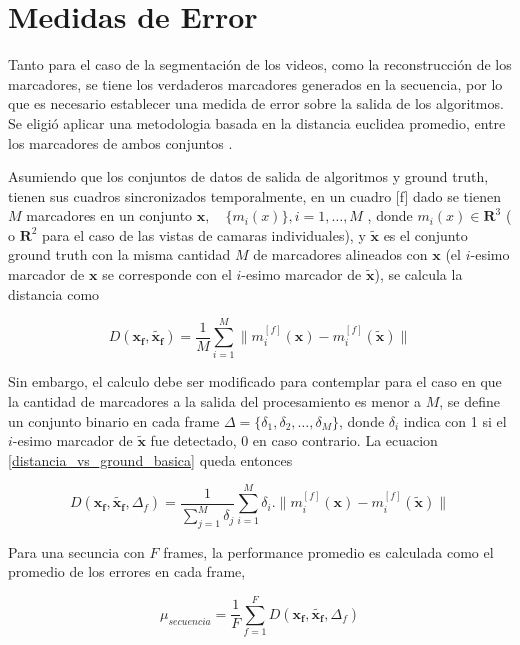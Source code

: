 \section{Medidas de Error}

Tanto para el caso de la segmentación de los videos, como la reconstrucción de los marcadores, se tiene los verdaderos marcadores generados en la secuencia, por lo que es necesario establecer una medida de error sobre la salida de los algoritmos. Se eligió aplicar una metodologia basada en la distancia euclidea promedio, entre los marcadores de ambos conjuntos \cite{humaneva} . 

Asumiendo que los conjuntos de datos de salida de algoritmos y ground truth, tienen sus cuadros sincronizados temporalmente, en un cuadro [f] dado se tienen $M$ marcadores en un conjunto $ \boldsymbol{x},\quad\{m_{i}(x)\},i=1,\ldots,M $ , donde $ m_{i}(x)\in{\mathbf{R}^{3}} $ ( o $ \mathbf{R}^{2} $ para el caso de las vistas de camaras individuales), y $ \boldsymbol{\tilde{x}} $ es el conjunto ground truth con la misma cantidad $M$ de marcadores alineados con $\boldsymbol{x}$ (el $i$-esimo marcador de $\boldsymbol{x}$ se corresponde con el  $i$-esimo marcador de $\boldsymbol{\tilde{x}}$), se calcula la distancia como

\begin{equation}
D(\boldsymbol{x_{f}},\boldsymbol{\tilde{x_{f}}})=\frac{1}{M}\sum_{i=1}^{M} \|m_{i}^{[f]}(\boldsymbol{x})-m_{i}^{[f]}(\boldsymbol{\tilde{x}})\|
\label{distancia_vs_ground_basica}
\end{equation}

Sin embargo, el calculo debe ser modificado para contemplar para el caso en que la cantidad de marcadores a la salida del procesamiento es menor a $M$, se define un conjunto binario en cada frame $\Delta=\{\delta_1,\delta_2,\ldots,\delta_M\}$, donde $\delta_i$ indica con 1 si el $i$-esimo marcador de $\boldsymbol{\tilde{x}}$ fue detectado, 0 en caso contrario. La ecuacion \ref{distancia_vs_ground_basica} queda entonces

\begin{equation}
D(\boldsymbol{x_{f}},\boldsymbol{\tilde{x_{f}}},\Delta_{f})=\frac{1}{\sum_{j=1}^{M} \delta_j} \sum_{i=1}^{M} \delta_i.\|m_{i}^{[f]}(\boldsymbol{x})-m_{i}^{[f]}(\boldsymbol{\tilde{x}})\|
\label{distancia_vs_ground_deteccion}
\end{equation}

Para una secuncia con $F$ frames, la performance promedio es calculada como el promedio de los errores en cada frame,

\begin{equation}
\mu_{secuencia} = \frac{1}{F}\sum_{f=1}^{F} D(\boldsymbol{x_{f}},\boldsymbol{\tilde{x_{f}}},\Delta_{f})
\label{performance_secuencia}
\end{equation}




